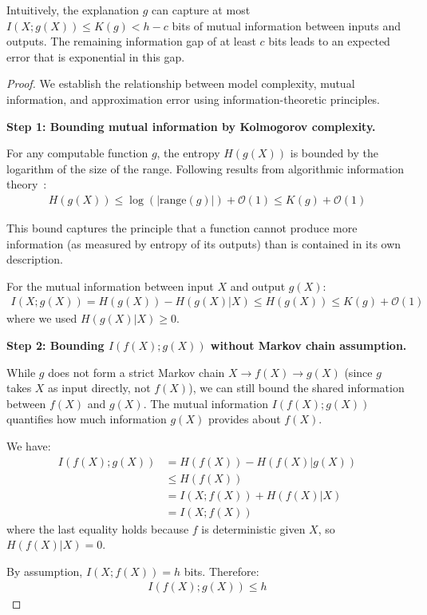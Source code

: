 \documentclass[11pt,letter,leqno]{article}
\begin{document}
Intuitively, the explanation $g$ can capture at most $I(X; g(X)) \leq K(g) < h - c$ bits of mutual information between inputs and outputs.  The remaining information gap of at least $c$ bits leads to an expected error that is exponential in this gap.

\begin{proof}
We establish the relationship between model complexity, mutual information, and 
approximation error using information-theoretic principles.

\textbf{Step 1: Bounding mutual information by Kolmogorov complexity.}

For any computable function $g$, the entropy $H(g(X))$ is bounded by the 
logarithm of the size of the range. Following results from algorithmic 
information theory~\cite{Vereshchagin2004,GacsTrompVitanyi2001,Li2008}:
\begin{align}
H(g(X)) \leq \log(|\text{range}(g)|) + \mathcal{O}(1) \leq K(g) + \mathcal{O}(1)
\end{align}

This bound captures the principle that a function cannot produce more 
information (as measured by entropy of its outputs) than is contained in 
its own description.

For the mutual information between input $X$ and output $g(X)$:
\begin{align}
I(X; g(X)) = H(g(X)) - H(g(X)|X) \leq H(g(X)) \leq K(g) + \mathcal{O}(1)
\end{align}
where we used $H(g(X)|X) \geq 0$.

\textbf{Step 2: Bounding $I(f(X); g(X))$ without Markov chain assumption.}

While $g$ does not form a strict Markov chain $X \to f(X) \to g(X)$ (since 
$g$ takes $X$ as input directly, not $f(X)$), we can still bound the shared 
information between $f(X)$ and $g(X)$. The mutual information 
$I(f(X); g(X))$ quantifies how much information $g(X)$ provides about $f(X)$.

We have:
\begin{align}
I(f(X); g(X)) &= H(f(X)) - H(f(X)|g(X))\\
&\leq H(f(X))\\
&= I(X; f(X)) + H(f(X)|X)\\
&= I(X; f(X))
\end{align}
where the last equality holds because $f$ is deterministic given $X$, 
so $H(f(X)|X) = 0$.

By assumption, $I(X; f(X)) = h$ bits. Therefore:
\begin{align}
I(f(X); g(X)) \leq h
\end{align}


\end{proof}
\end{document}

